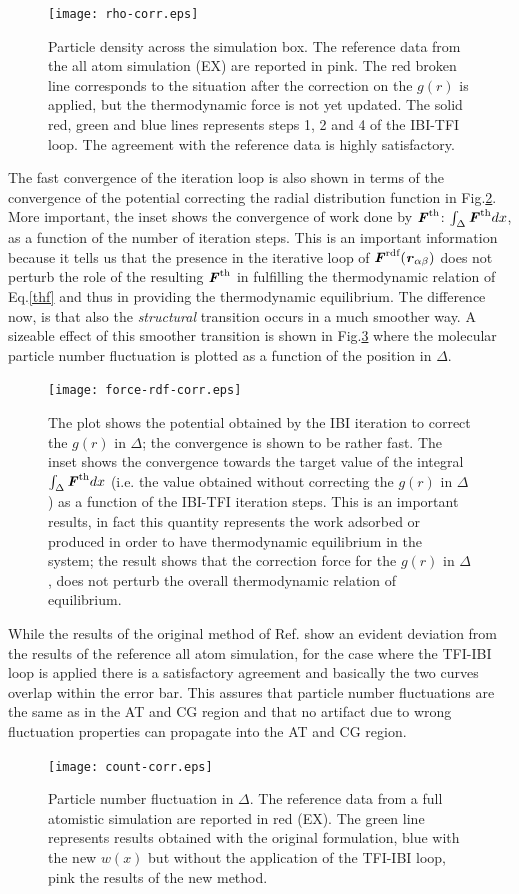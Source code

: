 \documentclass[aps,pre,preprint]{revtex4}
\renewcommand{\v}[1]{\textbf{\textit{#1}}}
\begin{document}
\begin{figure}
  \centering
  \texttt{[image: rho-corr.eps]}
  \caption{Particle density across the simulation box. The reference data from the all atom simulation (EX) are reported in pink. The red broken line corresponds to the situation after the correction on the $g(r)$ is applied, but the thermodynamic force is not yet updated. The solid red, green and blue lines represents steps 1, 2 and 4 of the IBI-TFI loop. The agreement with the reference data is highly satisfactory.}
  \label{rho}
\end{figure}
The fast convergence of the iteration loop is also shown in terms of the convergence of the potential correcting the radial distribution function in Fig.\ref{gpot}. More important, the inset shows the convergence of work done by ${\v F}^{\textrm{th}}$: $\int_{\Delta}{\v F}^{\textrm{th}}dx$, as a function of the number of iteration steps. This is an important information because it tells us that the presence in the iterative loop of $\v F^{\textrm{rdf}}(\v r_{\alpha\beta})$ does not perturb the role of the resulting ${\v F}^{\textrm{th}}$ in fulfilling the thermodynamic relation of Eq.\ref{thf} and thus in providing the thermodynamic equilibrium. The difference now, is that also the {\it structural} transition occurs in a much smoother way. A sizeable effect of this smoother transition is shown in Fig.\ref{fluct} where the molecular particle number fluctuation is plotted as a function of the position in $\Delta$.
\begin{figure}
  \centering
  \texttt{[image: force-rdf-corr.eps]}
  \caption{The plot shows the potential obtained by the IBI iteration to correct the $g(r)$ in $\Delta$; the convergence is shown to be rather fast. The inset shows the convergence towards the target value of the integral $\int_{\Delta}{\v F}^{\textrm{th}}dx$ (i.e. the value obtained without correcting the $g(r)$ in $\Delta$) as a function of the IBI-TFI iteration steps. This is an important results, in fact this quantity represents the work adsorbed or produced in order to have thermodynamic equilibrium in the system; the result shows that the correction force for the $g(r)$ in $\Delta$, does not perturb the overall thermodynamic relation of equilibrium.}
  \label{gpot}
\end{figure}
While the results of the original method of Ref.\cite{prlgc} show an evident deviation from the results of the reference all atom simulation, for the case where the TFI-IBI loop is applied there is a satisfactory agreement and basically the two curves overlap within the error bar. This assures that particle number fluctuations are the same as in the AT and CG region and that no artifact due to wrong fluctuation properties can propagate into the AT and CG region.
\begin{figure}
  \centering
  \texttt{[image: count-corr.eps]}
  \caption{Particle number fluctuation in $\Delta$. The reference data from a full atomistic simulation are reported in red (EX). The green line represents results obtained with the original formulation, blue with the new $w(x)$ but without the application of the TFI-IBI loop, pink the results of the new method.}
  \label{fluct}
\end{figure}
\end{document}
